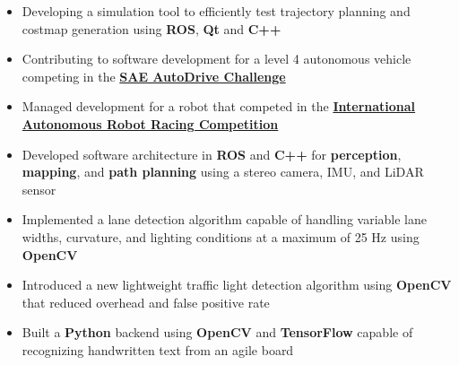 

\begin{itemize}
\item Developing a simulation tool to efficiently test trajectory planning and costmap generation  using \textbf{ROS}, \textbf{Qt} and \textbf{C++}
\item Contributing to software development for a level 4 autonomous vehicle competing in the \href{https://www.sae.org/attend/student-events/autodrive-challenge/}{\textbf{SAE AutoDrive Challenge}}
\end{itemize}
\divider

\begin{itemize}
\item Managed development for a robot that competed in the \href{https://iarrc.org/}{\textbf{International Autonomous Robot Racing Competition}} 
\item Developed software architecture in \textbf{ROS} and \textbf{C++} for \textbf{perception}, \textbf{mapping}, and \textbf{path planning} using a stereo camera, IMU, and LiDAR sensor
\item Implemented a lane detection algorithm capable of handling variable lane widths, curvature, and lighting conditions at a maximum of 25 Hz using \textbf{OpenCV} 
\item Introduced a new lightweight traffic light detection algorithm using \textbf{OpenCV} that reduced overhead and false positive rate
\end{itemize}


\begin{itemize}
\item Built a \textbf{Python} backend using \textbf{OpenCV} and \textbf{TensorFlow} capable of recognizing handwritten text from an agile board
\end{itemize}

